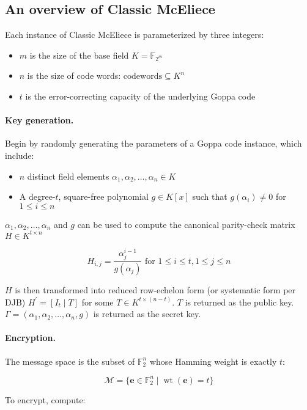 \documentclass{article}
\begin{document}

\subsection{An overview of Classic McEliece}
Each instance of Classic McEliece is parameterized by three integers: \begin{itemize}
    \item $m$ is the size of the base field $K = \mathbb{F}_{2^m}$
    \item $n$ is the size of code words: $\text{codewords} \subseteq K^n$
    \item $t$ is the error-correcting capacity of the underlying Goppa code
\end{itemize}

\paragraph{Key generation.} Begin by randomly generating the parameters of a Goppa code instance, which include: \begin{itemize}
    \item $n$ distinct field elements $\alpha_1, \alpha_2, \ldots, \alpha_n \in K$
    \item A degree-$t$, square-free polynomial $g \in K[x]$ such that $g(\alpha_i) \neq 0$ for $1 \leq i \leq n$
\end{itemize}

$\alpha_1, \alpha_2, \ldots, \alpha_n$ and $g$ can be used to compute the canonical parity-check matrix $H \in K^{t \times n}$

$$
H_{i,j} = \frac{\alpha_j^{i - 1}}{g(\alpha_j)} \text{ for } 1 \leq i \leq t, 1 \leq j \leq n
$$

$H$ is then transformed into reduced row-echelon form (or systematic form per DJB) $H^\prime = [I_t \mid T]$ for some $T \in K^{t \times (n - t)}$. $T$ is returned as the public key. $\Gamma = (\alpha_1, \alpha_2, \ldots, \alpha_n, g)$ is returned as the secret key.

\paragraph{Encryption.} The message space is the subset of $\mathbb{F}_2^n$ whose Hamming weight is exactly $t$:

$$\mathcal{M} = \{\mathbf{e} \in \mathbb{F}_2^n \mid \mathop{wt}(\mathbf{e}) = t\}$$

To encrypt, compute:
\end{document}
